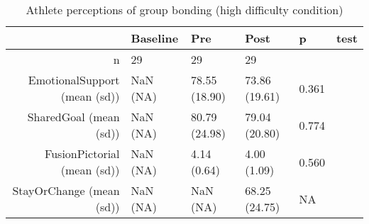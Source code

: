 \begin{table}[ht]
\centering
\begin{tabular}{rlllll}
  \hline
 & Baseline & Pre & Post & p & test \\ 
  \hline
n &  29 &    29 &    29 &  &  \\ 
  EmotionalSupport (mean (sd)) & NaN (NA) & 78.55 (18.90) & 73.86 (19.61) &  0.361 &  \\ 
  SharedGoal (mean (sd)) & NaN (NA) & 80.79 (24.98) & 79.04 (20.80) &  0.774 &  \\ 
  FusionPictorial (mean (sd)) & NaN (NA) &  4.14 (0.64) &  4.00 (1.09) &  0.560 &  \\ 
  StayOrChange (mean (sd)) & NaN (NA) &   NaN (NA) & 68.25 (24.75) &  NA &  \\ 
   \hline
\end{tabular}
\caption{Athlete perceptions of 
 group bonding (high difficulty condition)} 
\end{table}
